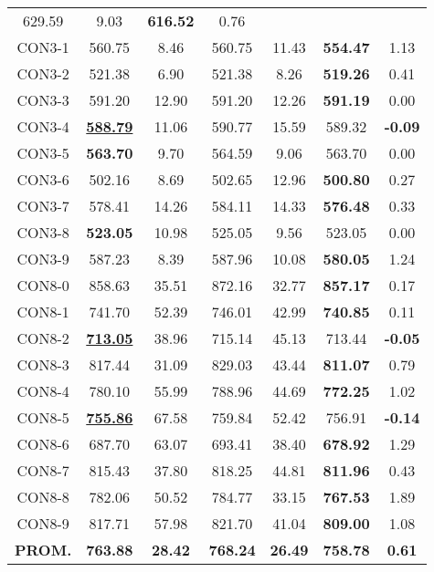 \begin{table}[ht]
\begin{tabular}{c c c c c c c}
629.59 & 9.03 & \bf{616.52} & 
0.76\\CON3-1 & 560.75 & 8.46 & 
560.75 & 11.43 & \bf{554.47} & 
1.13\\CON3-2 & 521.38 & 6.90 & 
521.38 & 8.26 & \bf{519.26} & 
0.41\\CON3-3 & 591.20 & 12.90 & 
591.20 & 12.26 & \bf{591.19} & 
0.00\\CON3-4 & \bf{\underline{588.79}} & 11.06 & 
590.77 & 15.59 & 589.32 & 
\bf{-0.09}\\CON3-5 & \bf{563.70} & 9.70 & 
564.59 & 9.06 & 563.70 & 0.00\\
CON3-6 & 502.16 & 8.69 & 
502.65 & 12.96 & \bf{500.80} & 
0.27\\CON3-7 & 578.41 & 14.26 & 
584.11 & 14.33 & \bf{576.48} & 
0.33\\CON3-8 & \bf{523.05} & 10.98 & 
525.05 & 9.56 & 523.05 & 0.00\\
CON3-9 & 587.23 & 8.39 & 
587.96 & 10.08 & \bf{580.05} & 
1.24\\CON8-0 & 858.63 & 35.51 & 
872.16 & 32.77 & \bf{857.17} & 
0.17\\CON8-1 & 741.70 & 52.39 & 
746.01 & 42.99 & \bf{740.85} & 
0.11\\CON8-2 & \bf{\underline{713.05}} & 38.96 & 
715.14 & 45.13 & 713.44 & 
\bf{-0.05}\\CON8-3 & 817.44 & 31.09 & 
829.03 & 43.44 & \bf{811.07} & 
0.79\\CON8-4 & 780.10 & 55.99 & 
788.96 & 44.69 & \bf{772.25} & 
1.02\\CON8-5 & \bf{\underline{755.86}} & 67.58 & 
759.84 & 52.42 & 756.91 & 
\bf{-0.14}\\CON8-6 & 687.70 & 63.07 & 
693.41 & 38.40 & \bf{678.92} & 
1.29\\CON8-7 & 815.43 & 37.80 & 
818.25 & 44.81 & \bf{811.96} & 
0.43\\CON8-8 & 782.06 & 50.52 & 
784.77 & 33.15 & \bf{767.53} & 
1.89\\CON8-9 & 817.71 & 57.98 & 
821.70 & 41.04 & \bf{809.00} & 
1.08\\\bf{PROM.} & 
\bf{763.88} & \bf{28.42} & \bf{768.24} & \bf{26.49} & \bf{758.78} & \bf{0.61}\\[1ex]\hline
\end{tabular}
\label{table:nonlin}
\end{table} \clearpage
